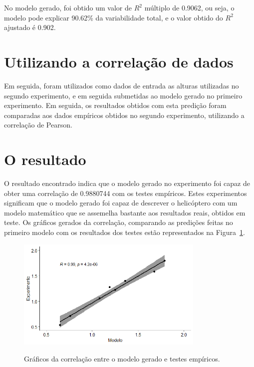  No modelo gerado, foi obtido um valor de $R^2$ múltiplo de 0.9062, ou seja, o modelo pode explicar 90.62\% da variabilidade total, e o valor obtido do $R^2$ ajustado é 0.902. 

\section{Utilizando a correlação de dados}
\label{sec:verificacao_do_modelo_utilizando_a_correlacao_de_dados}


Em seguida, foram utilizados como dados de entrada as alturas utilizadas no segundo experimento, e em seguida submetidas ao modelo gerado no primeiro experimento. Em seguida, os resultados obtidos com esta predição foram comparadas aos dados empíricos obtidos no segundo experimento, utilizando a correlação de Pearson. 

\section{O resultado}
\label{sec:verificacao_do_modelo_o_resultado}


O resultado encontrado indica que o modelo gerado no experimento foi capaz de obter uma correlação de 0.9880744 com os testes empíricos. Estes experimentos significam que o modelo gerado foi capaz de descrever o helicóptero com um modelo matemático que se assemelha bastante aos resultados reais, obtidos em teste. Os gráficos gerados da correlação, comparando as predições feitas no primeiro modelo com os resultados dos testes estão representados na Figura~\ref{fig:corr}.

\begin{figure}[H]
    \centering
    \caption{Gráficos da correlação entre o modelo gerado e testes empíricos.}
    \includegraphics[width=0.8\textwidth]{images/corr.png}
    \label{fig:corr}
  \end{figure}